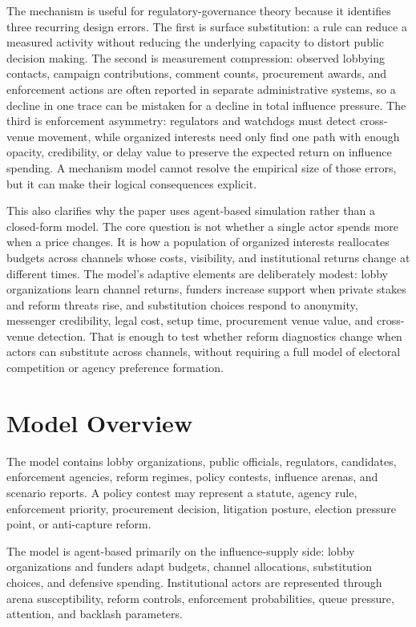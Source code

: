 The mechanism is useful for regulatory-governance theory because it identifies three recurring design errors. The first is surface substitution: a rule can reduce a measured activity without reducing the underlying capacity to distort public decision making. The second is measurement compression: observed lobbying contacts, campaign contributions, comment counts, procurement awards, and enforcement actions are often reported in separate administrative systems, so a decline in one trace can be mistaken for a decline in total influence pressure. The third is enforcement asymmetry: regulators and watchdogs must detect cross-venue movement, while organized interests need only find one path with enough opacity, credibility, or delay value to preserve the expected return on influence spending. A mechanism model cannot resolve the empirical size of those errors, but it can make their logical consequences explicit.

This also clarifies why the paper uses agent-based simulation rather than a closed-form model. The core question is not whether a single actor spends more when a price changes. It is how a population of organized interests reallocates budgets across channels whose costs, visibility, and institutional returns change at different times. The model's adaptive elements are deliberately modest: lobby organizations learn channel returns, funders increase support when private stakes and reform threats rise, and substitution choices respond to anonymity, messenger credibility, legal cost, setup time, procurement venue value, and cross-venue detection. That is enough to test whether reform diagnostics change when actors can substitute across channels, without requiring a full model of electoral competition or agency preference formation.

\section{Model Overview}

The model contains lobby organizations, public officials, regulators, candidates, enforcement agencies, reform regimes, policy contests, influence arenas, and scenario reports. A policy contest may represent a statute, agency rule, enforcement priority, procurement decision, litigation posture, election pressure point, or anti-capture reform.

The model is agent-based primarily on the influence-supply side: lobby organizations and funders adapt budgets, channel allocations, substitution choices, and defensive spending. Institutional actors are represented through arena susceptibility, reform controls, enforcement probabilities, queue pressure, attention, and backlash parameters.

